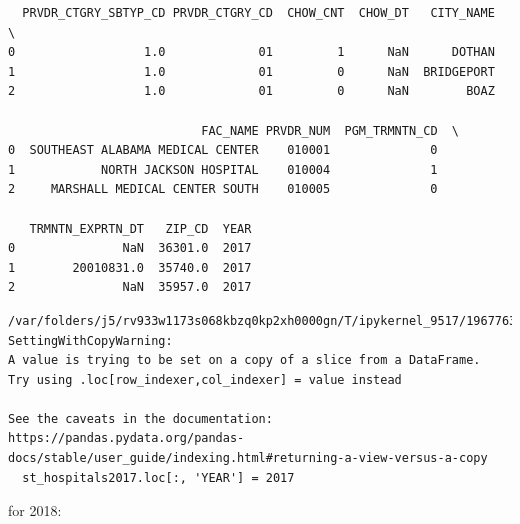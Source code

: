 \documentclass[
  letterpaper,
  DIV=11,
  numbers=noendperiod]{scrartcl}
\begin{document}
\begin{verbatim}
  PRVDR_CTGRY_SBTYP_CD PRVDR_CTGRY_CD  CHOW_CNT  CHOW_DT   CITY_NAME  \
0                  1.0             01         1      NaN      DOTHAN   
1                  1.0             01         0      NaN  BRIDGEPORT   
2                  1.0             01         0      NaN        BOAZ   

                           FAC_NAME PRVDR_NUM  PGM_TRMNTN_CD  \
0  SOUTHEAST ALABAMA MEDICAL CENTER    010001              0   
1            NORTH JACKSON HOSPITAL    010004              1   
2     MARSHALL MEDICAL CENTER SOUTH    010005              0   

   TRMNTN_EXPRTN_DT   ZIP_CD  YEAR  
0               NaN  36301.0  2017  
1        20010831.0  35740.0  2017  
2               NaN  35957.0  2017  
\end{verbatim}

\begin{verbatim}
/var/folders/j5/rv933w1173s068kbzq0kp2xh0000gn/T/ipykernel_9517/196776328.py:1: SettingWithCopyWarning: 
A value is trying to be set on a copy of a slice from a DataFrame.
Try using .loc[row_indexer,col_indexer] = value instead

See the caveats in the documentation: https://pandas.pydata.org/pandas-docs/stable/user_guide/indexing.html#returning-a-view-versus-a-copy
  st_hospitals2017.loc[:, 'YEAR'] = 2017
\end{verbatim}

for 2018:
\end{document}

